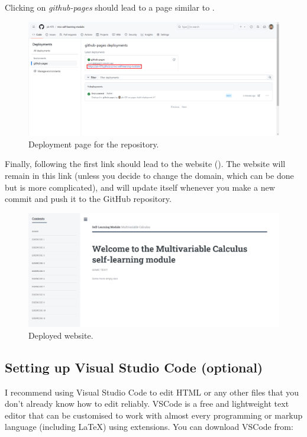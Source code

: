 \documentclass[a4paper,10pt]{article}
\begin{document}
Clicking on \emph{github-pages} should lead to a page similar to .

\begin{figure}[htbp]
    \centering
    \includegraphics[width=\textwidth]{deployment.png}
    \caption{Deployment page for the repository.}
    \label{fig:deployment}   
\end{figure}

Finally, following the first link should lead to the website (). The website will remain in this link (unless you decide to change the domain, which can be done but is more complicated), and will update itself whenever you make a new commit and push it to the GitHub repository.

\begin{figure}[htbp]
    \centering
    \includegraphics[width=\textwidth]{website.png}
    \caption{Deployed website.}
    \label{fig:website}   
\end{figure}


\subsection{Setting up Visual Studio Code (optional)}
\label{sec:vscode}

I recommend using Visual Studio Code to edit HTML or any other files that you don't already know how to edit reliably. VSCode is a free and lightweight text editor that can be customised to work with almost every programming or markup language (including \LaTeX) using extensions. You can download VSCode from:
\end{document}

